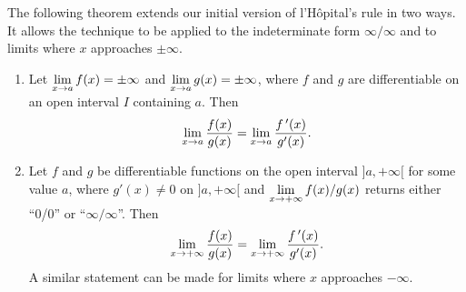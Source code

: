 The following theorem extends our initial version of l'H\^opital's rule in two ways. It allows the technique to be applied to the indeterminate form $\infty/\infty$ and to limits where $x$ approaches $\pm\infty$.

\begin{theorem}\label{thm:LHR2}

\begin{enumerate}
\item		Let $\displaystyle\lim_{x\to a}f(x) = \pm\infty$ and $\displaystyle\lim_{x\to a}g(x)=\pm \infty$, where $f$ and $g$ are differentiable on an open interval $I$ containing $a$. Then   
$$\lim_{x\to a} \frac{f(x)}{g(x)} = \lim_{x\to a}\frac{f\,'(x)}{g'(x)}.$$

\item		Let $f$ and $g$ be differentiable functions on the open interval $]a,+\infty[$ for some value $a$, where $g'(x)\neq 0$ on $]a,+\infty[$ and $\displaystyle\lim_{x\to+\infty} f(x)/g(x)$ returns either ``0/0'' or ``$\infty/\infty$''. Then
$$\lim_{x\to+\infty} \frac{f(x)}{g(x)} = \lim_{x\to +\infty}\frac{f\,'(x)}{g'(x)}.$$
A similar statement can be made for limits where $x$ approaches $-\infty$.
\end{enumerate}
\end{theorem}

